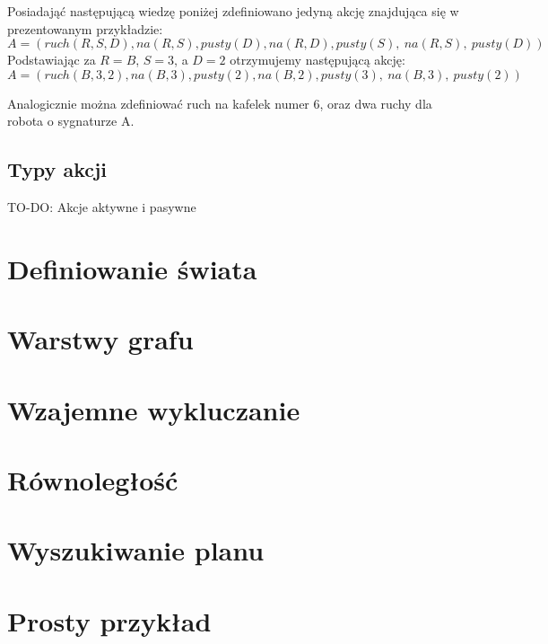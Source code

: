        Posiadająć następującą wiedzę poniżej zdefiniowano jedyną akcję znajdująca się w prezentowanym przykładzie:
    \begin{equation}
        A=(ruch(R,S,D),{na(R,S),pusty(D)},{na(R,D),pusty(S),~na(R,S),~pusty(D)})
    \end{equation}
    Podstawiając za $R=B$, $S=3$, a $D=2$ otrzymujemy następującą akcję: \\
        $A=(ruch(B,3,2),{na(B,3),pusty(2)},{na(B,2),pusty(3),~na(B,3),~pusty(2)})$
    
    Analogicznie można zdefiniować ruch na kafelek numer 6, oraz dwa ruchy dla robota o sygnaturze A.


    \subsection{Typy akcji}
        TO-DO: Akcje aktywne i pasywne

\section{Definiowanie świata}

\section{Warstwy grafu}

\section{Wzajemne wykluczanie}

\section{Równoległość}

\section{Wyszukiwanie planu}

\section{Prosty przykład}
